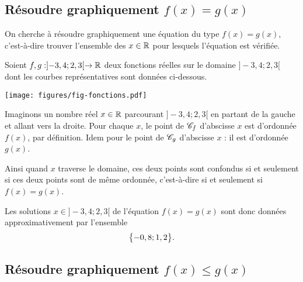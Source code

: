 

\newpage
\subsection*{Résoudre graphiquement $f(x) = g(x)$}

On cherche à résoudre graphiquement une équation du type $f(x)=g(x)$, c'est-à-dire trouver l'ensemble des $x\in\mathbb{R}$ pour lesquels l'équation est vérifiée.

Soient $f,g : ]{-}3,4 ; 2,3[ \rightarrow \mathbb{R}$ deux fonctions réelles sur le domaine $]{-}3,4 ; 2,3[$ dont les courbes représentatives sont données ci-dessous.

	\begin{center}
	 \texttt{[image: figures/fig-fonctions.pdf]}
	\end{center}
	
Imaginons un nombre réel $x\in\mathbb{R}$ parcourant $]{-}3,4 ; 2,3[$ en partant de la gauche et allant vers la droite.
Pour chaque $x$, le point de $\mathcal{C}_f$ d'abscisse $x$ est d'ordonnée $f(x)$, par définition.
Idem pour le point de $\mathcal{C}_g$ d'abscisse $x$ : il est d'ordonnée $g(x)$.

Ainsi quand $x$ traverse le domaine, ces deux points sont confondus si et seulement si ces deux points sont de même ordonnée, c'est-à-dire si et seulement si $f(x) = g(x)$.		
	
Les solutions $x\in]{-}3,4 ; 2,3[$ de l'équation $f(x) = g(x)$ sont donc données approximativement par l'ensemble
	\[ \bigl\{  -0,8 ; 1,2  \bigr\}. \]



\newpage
\subsection*{Résoudre graphiquement $f(x) \leq g(x)$}

